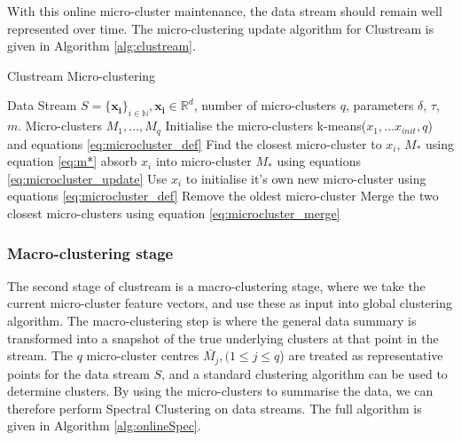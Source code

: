 With this online micro-cluster maintenance, the data stream should remain well represented over time. The micro-clustering update algorithm for Clustream is given in Algorithm \ref{alg:clustream}.


\begin{algorithm}
\caption{Clustream Micro-clustering}  
\begin{algorithmic}[1]
\REQUIRE Data Stream $S = \{\boldsymbol{ x_i} \}_{i \in \mathbb{N}}, \boldsymbol{x_i} \in \mathbb{R}^d$, number of micro-clusters $q$, parameters $\delta$, $\tau$, $m$.
\ENSURE Micro-clusters $M_1, \ldots, M_q$
\STATE Initialise the micro-clusters k-means($x_1, \hdots x_{init},q$) and equations \eqref{eq:microcluster_def}
 \STATE Find the closest micro-cluster to $x_i$, $M_*$ using equation \eqref{eq:m*}
   \STATE absorb $x_i$ into micro-cluster $M_*$ using equations \eqref{eq:microcluster_update}
 \ELSE
 \STATE Use $x_i$ to initialise it's own new micro-cluster using equations \eqref{eq:microcluster_def}
   \STATE Remove the oldest micro-cluster
  \ELSE 
   \STATE Merge the two closest micro-clusters using equation \eqref{eq:microcluster_merge}
  \ENDIF
\ENDIF
\ENDFOR
\end{algorithmic}
\label{alg:clustream}
\end{algorithm}
\subsubsection{Macro-clustering stage}
 
The second stage of clustream is a macro-clustering stage, where we take the current micro-cluster feature vectors, and use these as input into global clustering algorithm. The macro-clustering step is where the general data summary is transformed into a snapshot of the true underlying clusters at that point in the stream. The $q$ micro-cluster centres $\bar{M_j},(1 \leq j \leq q$) are treated as representative points for the data stream $S$, and a standard clustering algorithm can be used to determine clusters. By using the micro-clusters to summarise the data, we can therefore perform Spectral Clustering on data streams.  The full algorithm is given in Algorithm \ref{alg:onlineSpec}. %

